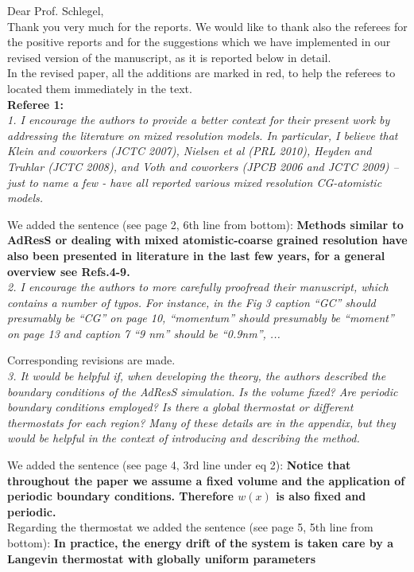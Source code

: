 \documentclass[a4paper]{article}
\begin{document}
\noindent
Dear Prof. Schlegel,\\

Thank you very much for the reports. We would like to thank also the referees for the positive reports and for the suggestions which we have implemented in our revised version of the manuscript, as it is reported below in detail.\\

In the revised paper, all the additions are marked in red, to help the referees to located them immediately in the text.\\

\noindent
{\bf Referee 1:}\\

\textit{
1. I encourage the authors to provide a better context for their
present work by addressing the literature on mixed resolution
models. In particular, I believe that Klein and coworkers (JCTC 2007),
Nielsen et al (PRL 2010), Heyden and Truhlar (JCTC 2008), and Voth and
coworkers (JPCB 2006 and JCTC 2009) – just to name a few - have all
reported various mixed resolution CG-atomistic models.
}

We added the sentence (see page 2, 6th line from bottom): {\bf Methods similar to AdResS or dealing with mixed atomistic-coarse grained resolution have also been presented in literature in the last few years, for a general overview see Refs.4-9.}
\\

\textit{
2. I encourage the authors to more carefully proofread their
manuscript, which contains a number of typos. For instance, in the Fig
3 caption ``GC'' should presumably be ``CG'' on page 10, ``momentum'' should
presumably be ``moment'' on page 13 and caption 7 “9 nm” should be
``0.9nm'', ...
}

Corresponding revisions are made. 
\\

\textit{
3. It would be helpful if, when developing the theory, the authors
described the boundary conditions of the AdResS simulation. Is the
volume fixed? Are periodic boundary conditions employed? Is there a
global thermostat or different thermostats for each region? Many of
these details are in the appendix, but they would be helpful in the
context of introducing and describing the method.
}

We added the sentence (see page 4, 3rd line under eq 2): {\bf Notice that throughout the paper we assume a fixed volume and the application of periodic boundary conditions. Therefore $w(x)$ is also fixed and periodic.}\\
Regarding the thermostat we added the sentence (see page 5, 5th line from bottom): {\bf In practice, the energy drift of the system is taken care by a Langevin thermostat with globally uniform parameters}
\\
\end{document}
